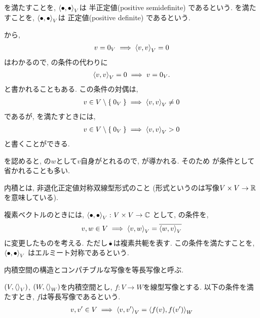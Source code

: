 \begin{remark}
を満たすことを,
  $\Braket{\bullet,\bullet}_V$は
半正定値(positive semidefinite)
  であるという.
  を満たすことを,
  $\Braket{\bullet,\bullet}_V$は
  正定値(positive definite)
  であるという.

  から,
  \begin{align*}
    v=0_V\implies \Braket{v,v}_V=0 
  \end{align*}
  はわかるので,
  の条件の代わりに
  \begin{align*}
    \Braket{v,v}_V=0\implies v=0_V.
  \end{align*}
  と書かれることもある.
  この条件の対偶は,
  \begin{align*}
    v\in V\setminus\Set{0_V}
    \implies
    \Braket{v,v}_V\neq 0
  \end{align*}
  であるが,
  を満たすときには,  
  \begin{align*}
    v\in V\setminus\Set{0_V}
    \implies
    \Braket{v,v}_V> 0
  \end{align*}
  と書くことができる.
  
  を認めると,
  の$w$として$v$自身がとれるので,
  が導かれる.
  そのため
  が条件として省かれることも多い.
\end{remark}

\begin{remark}
  内積とは,
  非退化正定値対称双線型形式のこと
  (形式というのは写像$V\times V\to \mathbb{R}$を意味している).
\end{remark}

\begin{remark}
  複素ベクトルのときには,
  $\Braket{\bullet,\bullet}_V\colon V\times V\to \mathbb{C}$
  として,
  の条件を,
  \begin{align*}
    v,w\in V \implies \Braket{v,w}_V=\overline{\Braket{w,v}_V}
  \end{align*}
  に変更したものを考える.
  ただし$\overline{\bullet}$は複素共軛を表す.
  この条件を満たすことを,
  $\Braket{\bullet,\bullet}_V$
  はエルミート対称であるという.
\end{remark}

内積空間の構造とコンパチブルな写像を等長写像と呼ぶ.
\begin{definition}
  $(V,\Braket{}_V)$, $(W,\Braket{}_W)$を内積空間とし,
  $f\colon V\to W$を線型写像とする.
  以下の条件を満たすとき,
  $f$は等長写像であるという.
  \begin{align*}
    v,v'\in V\implies
    \Braket{v,v'}_V
    =
    \Braket{f(v),f(v')}_W
  \end{align*}
\end{definition}

